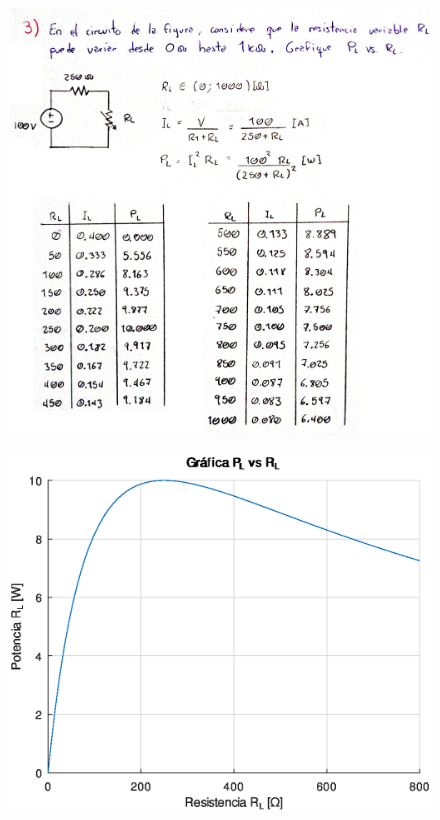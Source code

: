 \documentclass[letter,11pt]{article}
\begin{document}
\begin{figure}[!h]
\centering
\includegraphics[scale=0.18]{resources/preinforme2.eps}
\end{figure}

\newpage

\begin{figure}[!h]
\centering
\includegraphics[scale=0.80]{simulation/grafica.eps}
\end{figure}
\end{document}
